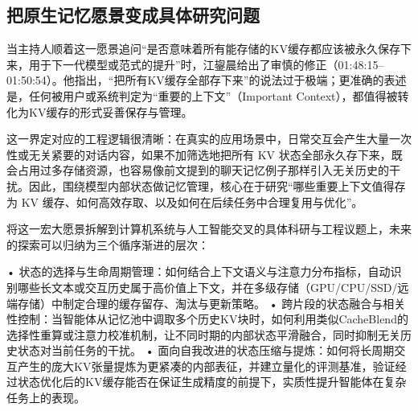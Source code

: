 \documentclass[UTF8,a4paper,11pt,fontset=fandol]{ctexart}
\begin{document}
\subsection{把原生记忆愿景变成具体研究问题}
当主持人顺着这一愿景追问“是否意味着所有能存储的KV缓存都应该被永久保存下来，用于下一代模型或范式的提升”时，江鋆晨给出了审慎的修正（01:48:15–01:50:54）。他指出，“把所有KV缓存全部存下来”的说法过于极端；更准确的表述是，任何被用户或系统判定为“重要的上下文”（Important Context），都值得被转化为KV缓存的形式妥善保存与管理。

这一界定对应的工程逻辑很清晰：在真实的应用场景中，日常交互会产生大量一次性或无关紧要的对话内容，如果不加筛选地把所有 KV 状态全部永久存下来，既会占用过多存储资源，也容易像前文提到的聊天记忆例子那样引入无关历史的干扰。因此，围绕模型内部状态做记忆管理，核心在于研究“哪些重要上下文值得存为 KV 缓存、如何高效存取、以及如何在后续任务中合理复用与优化”。

将这一宏大愿景拆解到计算机系统与人工智能交叉的具体科研与工程议题上，未来的探索可以归纳为三个循序渐进的层次：

• 状态的选择与生命周期管理：如何结合上下文语义与注意力分布指标，自动识别哪些长文本或交互历史属于高价值上下文，并在多级存储（GPU/CPU/SSD/远端存储）中制定合理的缓存留存、淘汰与更新策略。
• 跨片段的状态融合与相关性控制：当智能体从记忆池中调取多个历史KV块时，如何利用类似CacheBlend的选择性重算或注意力校准机制，让不同时期的内部状态平滑融合，同时抑制无关历史状态对当前任务的干扰。
• 面向自我改进的状态压缩与提炼：如何将长周期交互产生的庞大KV张量提炼为更紧凑的内部表征，并建立量化的评测基准，验证经过状态优化后的KV缓存能否在保证生成精度的前提下，实质性提升智能体在复杂任务上的表现。
\end{document}
